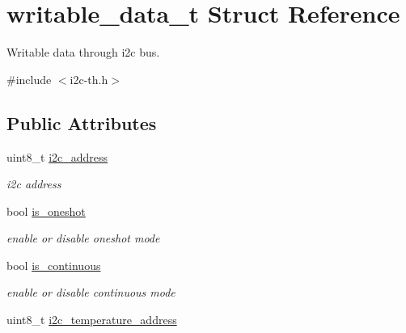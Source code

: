 \hypertarget{structwritable__data__t}{}\section{writable\+\_\+data\+\_\+t Struct Reference}
\label{structwritable__data__t}


Writable data through i2c bus.  




{\ttfamily \#include $<$i2c-\/th.\+h$>$}

\subsection*{Public Attributes}
\begin{DoxyCompactItemize}
\item 
\mbox{\label{structwritable__data__t_a539304e9f0f30b03691af8b1e8cb6a16}} 
uint8\+\_\+t \hyperlink{structwritable__data__t_a539304e9f0f30b03691af8b1e8cb6a16}{i2c\+\_\+address}
\begin{DoxyCompactList}\small\item\em i2c address \end{DoxyCompactList}\item 
\mbox{\label{structwritable__data__t_afc3c86659df5f3a0840313702c7f66fe}} 
bool \hyperlink{structwritable__data__t_afc3c86659df5f3a0840313702c7f66fe}{is\+\_\+oneshot}
\begin{DoxyCompactList}\small\item\em enable or disable oneshot mode \end{DoxyCompactList}\item 
\mbox{\label{structwritable__data__t_a9c3b7927d969d6f21fe475fd3d67f485}} 
bool \hyperlink{structwritable__data__t_a9c3b7927d969d6f21fe475fd3d67f485}{is\+\_\+continuous}
\begin{DoxyCompactList}\small\item\em enable or disable continuous mode \end{DoxyCompactList}\item 
\mbox{\label{structwritable__data__t_ad1852e6418870b503cc307a106aff52e}} 
uint8\+\_\+t \hyperlink{structwritable__data__t_ad1852e6418870b503cc307a106aff52e}{i2c\+\_\+temperature\+\_\+address}

\end{DoxyCompactItemize}
